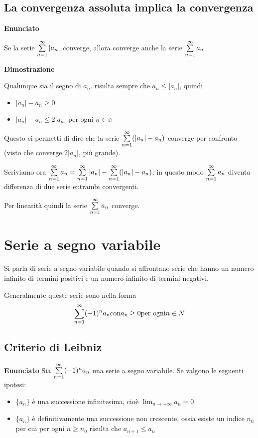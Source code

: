 \subsection{La convergenza assoluta implica la convergenza}

\textbf{Enunciato}

Se la serie $\sum\limits_{n=1}^{\infty}|a_n|$ converge, allora converge anche la serie $\sum\limits_{n=1}^{\infty}a_n$  

\textbf{Dimostrazione}

Qualunque sia il segno di $a_n$. risulta sempre che $a_n \leq |a_n|$, quindi 
\begin{itemize}
\item $|a_n|-a_n \geq 0$
\item $|a_n|-a_n \leq 2|a_n|$ per ogni $n \in \mathbb{n}$
\end{itemize}

Questo ci permetti di dire che la serie $\sum\limits_{n=1}^{\infty}(|a_n|-a_n)$ converge per confronto (visto che converge $2|a_n|$, più grande).

Scriviamo ora $\sum\limits_{n=1}^{\infty}a_n=\sum\limits_{n=1}^{\infty}|a_n|-\sum\limits_{n=1}^{\infty}(|a_n|-a_n)$: in questo modo $\sum\limits_{n=1}^{\infty}a_n$ diventa differenza di due serie entrambi convergenti.

Per linearità quindi la serie $\sum\limits_{n=1}^{\infty}a_n$ converge.

\section{Serie a segno variabile}

Si parla di serie a segno variabile quando si affrontano serie che hanno un numero infinito di termini positivi e un numero infinito di termini negativi.

Generalmente queste serie sono nella forma $$\sum\limits_{n=1}^{\infty}(-1)^n a_n \text{con} a_n \geq 0 \text{per ogni} n\in N$$

\subsection{Criterio di Leibniz}

\textbf{Enunciato}
Sia $\sum\limits_{n=1}^{\infty}(-1)^n a_n$ una serie a segno variabile. Se valgono le seguenti ipotesi:
\begin{itemize}
\item $\{a_n\}$ è una successione infinitesima, cioè $\lim_{n\to +\infty} a_n=0$
\item $\{a_n\}$ è definitivamente una successione non crescente, ossia esiste un indice $n_0$ per cui per ogni $n \geq n_0$  risulta che $a_{n+1} \leq a_{n}$
\end{itemize}

